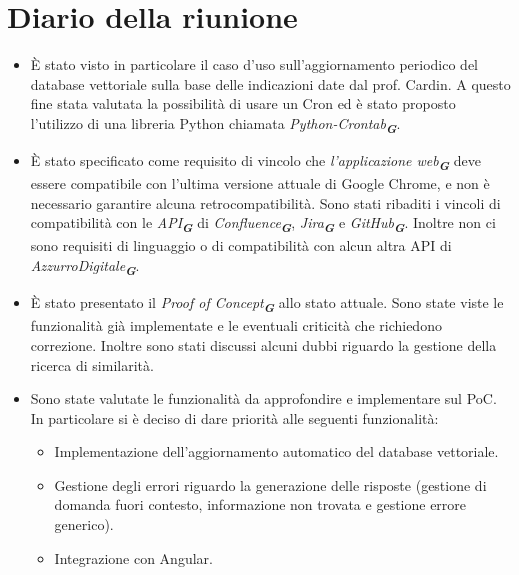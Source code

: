 
\section{Diario della riunione}

\begin{itemize}
    \item È stato visto in particolare il caso d'uso sull'aggiornamento periodico del database vettoriale sulla base delle indicazioni date dal prof. Cardin.
    A questo fine stata valutata la possibilità di usare un Cron ed è stato proposto l'utilizzo di una libreria Python chiamata \emph{Python-Crontab}\textsubscript{\textbf{\textit{G}}}.
    \item È stato specificato come requisito di vincolo che \emph{l'applicazione web}\textsubscript{\textbf{\textit{G}}} deve essere compatibile con l'ultima versione attuale di Google Chrome,
    e non è necessario garantire alcuna retrocompatibilità. Sono stati ribaditi i vincoli di compatibilità con le \emph{API}\textsubscript{\textbf{\textit{G}}} di \emph{Confluence}\textsubscript{\textbf{\textit{G}}}, \emph{Jira}\textsubscript{\textbf{\textit{G}}} e \emph{GitHub}\textsubscript{\textbf{\textit{G}}}.
    Inoltre non ci sono requisiti di linguaggio o di compatibilità con alcun altra API di \emph{AzzurroDigitale}\textsubscript{\textbf{\textit{G}}}.
    \item È stato presentato il \emph{Proof of Concept}\textsubscript{\textbf{\textit{G}}} allo stato attuale. Sono state viste le funzionalità già implementate e le eventuali criticità che richiedono correzione.
    Inoltre sono stati discussi alcuni dubbi riguardo la gestione della ricerca di similarità.
    \item Sono state valutate le funzionalità da approfondire e implementare sul PoC.
    In particolare si è deciso di dare priorità alle seguenti funzionalità:
    \begin{itemize}
        \item Implementazione dell'aggiornamento automatico del database vettoriale.
        \item Gestione degli errori riguardo la generazione delle risposte (gestione di domanda fuori contesto, informazione non trovata e gestione errore generico).
        \item Integrazione con Angular.
    \end{itemize}

\end{itemize}

